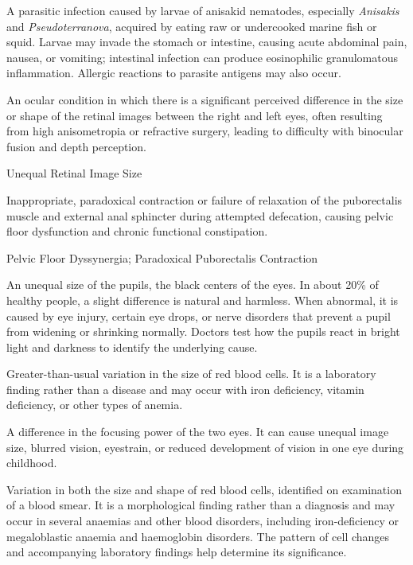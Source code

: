  A parasitic infection caused by larvae of anisakid nematodes, especially
\textit{Anisakis} and \textit{Pseudoterranova}, acquired by eating raw or undercooked marine fish
or squid. Larvae may invade the stomach or intestine, causing acute abdominal pain, nausea, or
vomiting; intestinal infection can produce eosinophilic granulomatous inflammation. Allergic
reactions to parasite antigens may also occur.

 An ocular condition in which there is a significant perceived difference in the size or shape of the retinal images between the right and left eyes, often resulting from high anisometropia or refractive surgery, leading to difficulty with binocular fusion and depth perception.

\synonyms
Unequal Retinal Image Size

 Inappropriate, paradoxical contraction or failure of relaxation of the puborectalis muscle and external anal sphincter during attempted defecation, causing pelvic floor dysfunction and chronic functional constipation.

\synonyms
Pelvic Floor Dyssynergia; Paradoxical Puborectalis Contraction

 An unequal size of the pupils, the black centers of the eyes. In about 20\% of healthy people, a slight difference is natural and harmless. When abnormal, it is caused by eye injury, certain eye drops, or nerve disorders that prevent a pupil from widening or shrinking normally. Doctors test how the pupils react in bright light and darkness to identify the underlying cause.

 Greater-than-usual variation in the size of red blood cells. It is a laboratory finding rather than a disease and may occur with iron deficiency, vitamin deficiency, or other types of anemia.

 A difference in the focusing power of the two eyes. It can cause unequal image size, blurred vision, eyestrain, or reduced development of vision in one eye during childhood.

 Variation in both the size and shape of red blood cells, identified
on examination of a blood smear. It is a morphological finding rather than a diagnosis and may
occur in several anaemias and other blood disorders, including iron-deficiency or megaloblastic
anaemia and haemoglobin disorders. The pattern of cell changes and accompanying laboratory
findings help determine its significance.

